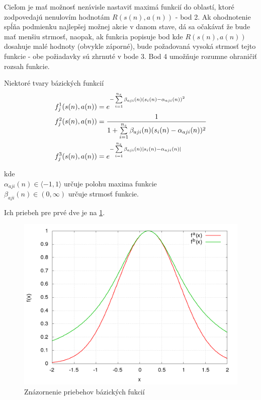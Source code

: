 Cieľom je mať možnosť nezávisle nastaviť maximá funkcií do oblastí, ktoré zodpovedajú
nenulovím hodnotám $R(s(n), a(n))$ - bod 2. Ak ohodnotenie spĺňa podmienku najlepšej
možnej akcie v danom stave, dá sa očakávať že bude mať menšiu strmosť, naopak, ak funkcia
popisuje bod kde $R(s(n), a(n))$ dosahuje malé hodnoty (obvykle záporné), bude požadovaná
vysoká strmosť tejto funkcie - obe požiadavky sú zhrnuté v bode 3. Bod 4 umožňuje rozumne
ohraničiť rozsah funkcie.

Niektoré tvary bázických funkcií
\begin{align}
    f_j^1(\boldmath{s(n), a(n)}) &= e^{ -\sum\limits_{i=1}^{n_s}{\beta_{aji}(n)(s_i(n) - \alpha_{aji}(n))^2} }  \\
    f_j^2(\boldmath{s(n), a(n)}) &= \frac{1}{1 + \sum\limits_{i=1}^{n_s}{\beta_{aji}(n)(s_i(n) - \alpha_{aji}(n))^2}}  \\
    f_j^3(\boldmath{s(n), a(n)}) &= e^{ -\sum\limits_{i=1}^{n_s}{\beta_{aji}(n)\mid s_i(n) - \alpha_{aji}(n) \mid} }
    \label{eq:basis_functions_01}
\end{align}

kde \\
$\alpha_{aji}(n) \in \langle -1, 1 \rangle$ určuje polohu maxima funkcie \\
$\beta_{aji}(n) \in (0, \infty)$ určuje strmosť funkcie.

Ich priebeh pre prvé dve je na \ref{img:basis_funcions}.

\begin{figure}[]
\center
\includegraphics[scale=.4]{../pictures/gaussian_1D.png}
\caption{Znázornenie priebehov bázických fukcií}
\label{img:basis_funcions}
\end{figure}

